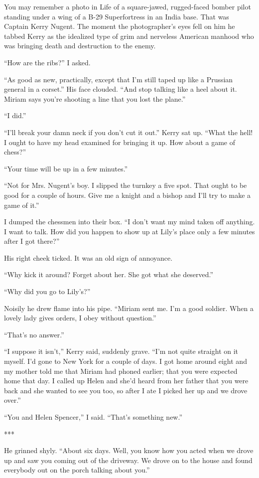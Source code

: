 \documentclass{novel}
\begin{document}
{You may remember a photo in Life of a square-jawed, rugged-faced bomber pilot standing under a wing of a B-29 Superfortress in an India base. That was Captain Kerry Nugent. The moment the photographer’s eyes fell on him he tabbed Kerry as the idealized type of grim and nerveless American manhood who was bringing death and destruction to the enemy.

“How are the ribs?” I asked.

“As good as new, practically, except that I’m still taped up like a Prussian general in a corset.” His face clouded. “And stop talking like a heel about it. Miriam says you’re shooting a line that you lost the plane.”

“I did.”

“I’ll break your damn neck if you don’t cut it out.” Kerry sat up. “What the hell! I ought to have my head examined for bringing it up. How about a game of chess?”

“Your time will be up in a few minutes.”

“Not for Mrs. Nugent’s boy. I slipped the turnkey a five spot. That ought to be good for a couple of hours. Give me a knight and a bishop and I’ll try to make a game of it.”

I dumped the chessmen into their box. “I don’t want my mind taken off anything. I want to talk. How did you happen to show up at Lily’s place only a few minutes after I got there?”

His right cheek ticked. It was an old sign of annoyance.

“Why kick it around? Forget about her. She got what she deserved.”

“Why did you go to Lily’s?”

Noisily he drew flame into his pipe. “Miriam sent me. I’m a good soldier. When a lovely lady gives orders, I obey without question.”

“That’s no answer.”

“I suppose it isn’t,” Kerry said, suddenly grave. “I’m not quite straight on it myself. I’d gone to New York for a couple of days. I got home around eight and my mother told me that Miriam had phoned earlier; that you were expected home that day. I called up Helen and she’d heard from her father that you were back and she wanted to see you too, so after I ate I picked her up and we drove over.”

“You and Helen Spencer,” I said. “That’s something new.”

***

He grinned shyly. “About six days. Well, you know how you acted when we drove up and saw you coming out of the driveway. We drove on to the house and found everybody out on the porch talking about you.”

}
\end{document}
